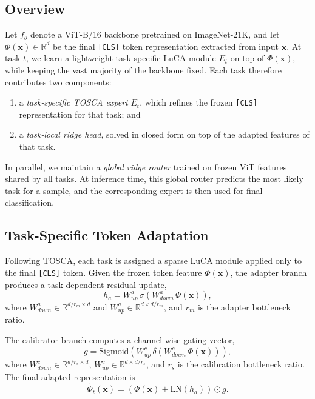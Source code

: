 \documentclass{article}
\begin{document}
\subsection{Overview}
\label{subsec:method-overview}

Let \(f_{\theta}\) denote a ViT-B/16 backbone pretrained on ImageNet-21K,
and let \(\Phi(\mathbf{x}) \in \mathbb{R}^{d}\) be the final
\texttt{[CLS]} token representation extracted from input \(\mathbf{x}\).
At task \(t\), we learn a lightweight task-specific LuCA module
\(E_t\) on top of \(\Phi(\mathbf{x})\), while keeping the vast majority of
the backbone fixed. Each task therefore contributes two components:



\begin{enumerate}
    \item a \emph{task-specific TOSCA expert} \(E_t\), which refines the
    frozen \texttt{[CLS]} representation for that task; and
    \item a \emph{task-local ridge head}, solved in closed form on top of the
    adapted features of that task.
\end{enumerate}

In parallel, we maintain a \emph{global ridge router} trained on frozen ViT
features shared by all tasks. At inference time, this global router predicts
the most likely task for a sample, and the corresponding expert is then used
for final classification.

\subsection{Task-Specific Token Adaptation}
\label{subsec:method-tosca}

Following TOSCA, each task is assigned a sparse LuCA module applied only to
the final \texttt{[CLS]} token. Given the frozen token feature
\(\Phi(\mathbf{x})\), the adapter branch produces a task-dependent residual
update,
\begin{equation}
    h_a = W^{a}_{up}\,\sigma\!\left(W^{a}_{down}\,\Phi(\mathbf{x})\right),
\end{equation}
where \(W^{a}_{down} \in \mathbb{R}^{d/r_m \times d}\) and
\(W^{a}_{up} \in \mathbb{R}^{d \times d/r_m}\), and \(r_m\) is the adapter
bottleneck ratio.

The calibrator branch computes a channel-wise gating vector,
\begin{equation}
    g = \mathrm{Sigmoid}\!\left(
    W^{c}_{up}\,\delta\!\left(W^{c}_{down}\,\Phi(\mathbf{x})\right)
    \right),
\end{equation}
where \(W^{c}_{down} \in \mathbb{R}^{d/r_s \times d}\),
\(W^{c}_{up} \in \mathbb{R}^{d \times d/r_s}\), and \(r_s\) is the
calibration bottleneck ratio. The final adapted representation is
\begin{equation}
    \tilde{\Phi}_t(\mathbf{x}) =
    \left(\Phi(\mathbf{x}) + \mathrm{LN}(h_a)\right) \odot g.
\end{equation}
\end{document}
